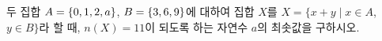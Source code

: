 두 집합 $A=\{0{,}\mkern3mu\mathopen{}1{,}\mkern3mu\mathopen{}2{,}\mkern3mu\mathopen{}a\}$, $B=\{3{,}\mkern3mu\mathopen{}6{,}\mkern3mu\mathopen{}9\}$에 대하여 집합 $X$를 $X=\{x+y \mid x\in A$, $y\in B\}$라 할 때, $n(X)=11$이 되도록 하는 자연수 $a$의 최솟값을 구하시오.

